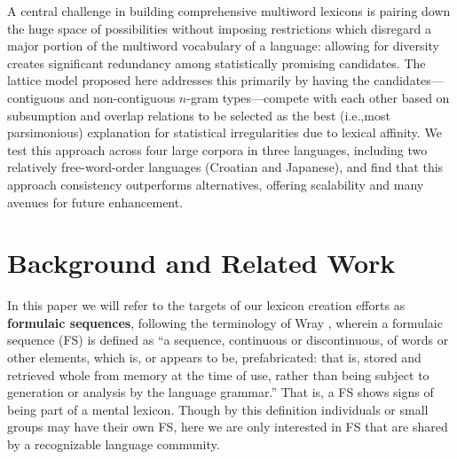 \documentclass[11pt,letterpaper]{article}
\makeatletter
\def \ie {i.e.,\@ }
\newcommand{\termdef}[1]{\textbf{#1}\xspace}
\makeatother
\begin{document}
A central challenge in building comprehensive multiword lexicons is pairing down the huge space of possibilities without imposing restrictions which disregard a major portion of the multiword vocabulary of a language: allowing for diversity creates significant redundancy among statistically promising candidates. The lattice model proposed here addresses this primarily by having the candidates---contiguous and non-contiguous $n$-gram types---compete with each other based on subsumption and overlap relations to be selected as the best (\ie most parsimonious) explanation for statistical irregularities due to lexical affinity. We test this approach across four large corpora in three languages, including two relatively free-word-order languages (Croatian and Japanese), and find that this approach consistency outperforms alternatives, offering scalability and many avenues for future enhancement.




\section{Background and Related Work}

In this paper we will refer to the targets of our lexicon creation efforts as \termdef{formulaic sequences}, following the terminology of Wray , wherein a formulaic sequence (FS) is defined as ``a sequence, continuous or discontinuous, of words or other elements, which is, or appears to be, prefabricated: that is, stored and retrieved whole from memory at the time of use, rather than being subject to generation or analysis by the language grammar.'' That is, a FS shows signs of being part of a mental lexicon. Though by this definition individuals or small groups may have their own FS, here we are only interested in FS that are shared by a recognizable language community. 
\end{document}

